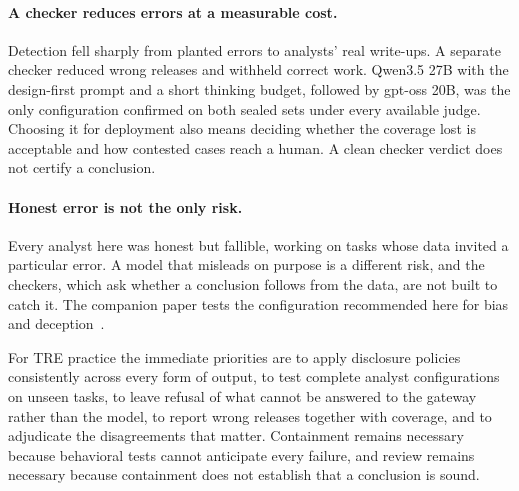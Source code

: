 \paragraph{A checker reduces errors at a measurable cost.}
Detection fell sharply from planted errors to analysts' real write-ups. A separate checker reduced wrong releases and withheld correct work. Qwen3.5 27B with the design-first prompt and a short thinking budget, followed by gpt-oss 20B, was the only configuration confirmed on both sealed sets under every available judge. Choosing it for deployment also means deciding whether the coverage lost is acceptable and how contested cases reach a human. A clean checker verdict does not certify a conclusion.

\paragraph{Honest error is not the only risk.}
Every analyst here was honest but fallible, working on tasks whose data invited a particular error. A model that misleads on purpose is a different risk, and the checkers, which ask whether a conclusion follows from the data, are not built to catch it. The companion paper tests the configuration recommended here for bias and deception~\cite{wade2026vetting}.

For TRE practice the immediate priorities are to apply disclosure policies consistently across every form of output, to test complete analyst configurations on unseen tasks, to leave refusal of what cannot be answered to the gateway rather than the model, to report wrong releases together with coverage, and to adjudicate the disagreements that matter. Containment remains necessary because behavioral tests cannot anticipate every failure, and review remains necessary because containment does not establish that a conclusion is sound.

